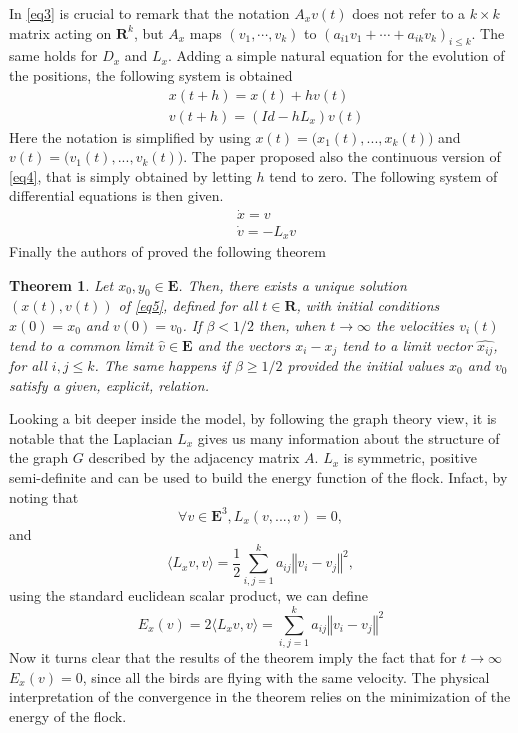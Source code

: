 \documentclass{article} %
\newcounter{math}
\newtheorem{theorem}{Theorem}
\begin{document}
In \eqref{eq3} is crucial to remark that the notation $A_xv(t)$ does not refer to a 
$k \times k$ matrix acting on $\mathbf{R}^k$, but $A_x$ maps $(v_1, \dotsb ,v_k)$ 
to $(a_{i1}v_1+ \dotsb +a_{ik}v_k)_{i\leq k}$. The same holds for $D_x$ and $L_x$.
Adding a simple natural equation for the evolution of the positions, the following
system is obtained
\begin{align}
\label{eq4}
    &x(t+h) = x(t) + hv(t)\\
    &v(t+h) = (Id -hL_x)v(t)\nonumber
\end{align}
Here the notation is simplified by using $x(t)=\big(x_1(t),...,x_k(t)\big)$ and
$v(t)=\big(v_1(t),...,v_k(t)\big)$.
The paper \cite{CuckerSmale} proposed also the continuous version of \eqref{eq4}, that
is simply obtained by letting $h$ tend to zero. The following system of differential 
equations is then given.
\begin{align}
\label{eq5}
    &\dot{x} = v\\
    &\dot{v} = -L_xv\nonumber
\end{align}
Finally the authors of \cite{CuckerSmale} proved the following theorem
\begin{theorem}
    Let $x_0,y_0\in \mathbf{E}$. Then, there exists a unique solution $(x(t),v(t))$ of 
    \eqref{eq5}, defined for all $t \in \mathbf{R}$, with initial conditions $x(0)=x_0$ and
    $v(0)=v_0$. If $\beta<1/2$ then, when $t\rightarrow\infty$ the velocities $v_i(t)$ tend
    to a common limit $\widehat{v}\in\mathbf{E}$ and the vectors $x_i-x_j$ tend to a limit 
    vector $\widehat{x_{ij}}$, for all $i,j\leq k$. The same happens if $\beta\geq1/2$ provided
    the initial values $x_0$ and $v_0$ satisfy a given, explicit, relation.
\end{theorem}
Looking a bit deeper inside the model, by following the graph theory view, it is notable that
the Laplacian $L_x$ gives us many information about the structure of the graph $G$ described
by the adjacency matrix $A$. $L_x$ is symmetric, positive semi-definite and can be used to 
build the energy function of the flock. Infact, by noting that
\begin{equation}
	\label{eq6}
	\forall v \in \mathbf{E}^3, L_x(v,...,v)=0,
\end{equation} and
\begin{equation}
	\label{eq7}
	\langle L_xv,v\rangle=\frac{1}{2}\sum_{i,j=1}^ka_{ij}\left\Vert v_i - v_j\right\Vert^2,
\end{equation}
using the standard euclidean scalar product, we can define 
\begin{equation}
	\label{eq8}
	E_x(v)=2\langle L_xv,v\rangle=\sum_{i,j=1}^ka_{ij}\left\Vert v_i - v_j\right\Vert^2
\end{equation}
Now it turns clear that the results of the theorem imply the fact that for $t\rightarrow\infty$ $E_x(v)=0$,
since all the birds are flying with the same velocity. The physical interpretation of the 
convergence in the theorem relies on the minimization of the energy of the flock.
\end{document}

